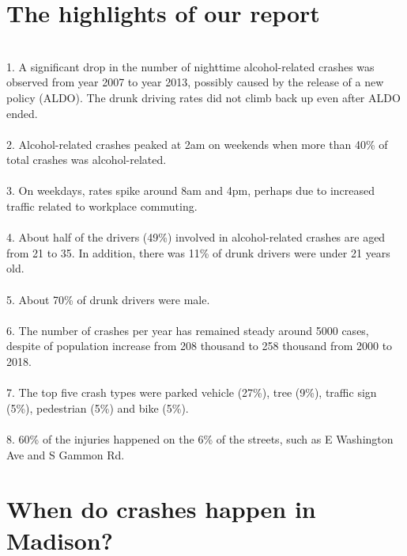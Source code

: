 \documentclass[15pt]{article}
\begin{document}
\section{The highlights of our report}
~\\
1. A significant drop in the number of nighttime alcohol-related crashes was observed from year 2007 to year 2013, possibly caused by the release of a new policy (ALDO). The drunk driving rates did not climb back up even after ALDO ended.
~\\
~\\
2. Alcohol-related crashes peaked at 2am on weekends when more than 40\% of total crashes was alcohol-related.
~\\
~\\
3. On weekdays, rates spike around 8am and 4pm, perhaps due to increased traffic related to workplace commuting. 
~\\
~\\
4. About half of the drivers (49\%) involved in alcohol-related crashes are aged from 21 to 35. In addition, there was 11\% of drunk drivers were under 21 years old. 
~\\
~\\
5. About 70\% of drunk drivers were male.
~\\
~\\
6. The number of crashes per year has remained steady around 5000 cases, despite of population increase from 208 thousand to 258 thousand from 2000 to 2018. 
~\\
~\\
7. The top five crash types were parked vehicle (27\%), tree (9\%), traffic sign (5\%), pedestrian (5\%) and bike (5\%).
~\\
~\\
8. 60\% of the injuries happened on the 6\% of the streets, such as E Washington Ave and S Gammon Rd. 

\newpage
\section{When do crashes happen in Madison?}
\end{document}
